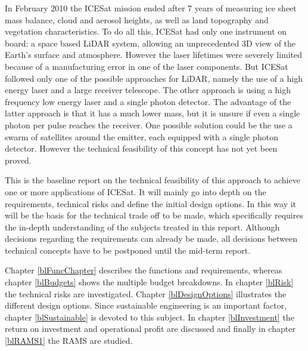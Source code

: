 In February 2010 the ICESat mission ended after 7 years of measuring ice sheet mass balance, cloud and aerosol heights, as well as land topography and vegetation characteristics.
To do all this, ICESat had only one instrument on board: a space based \ac{LiDAR} system, allowing an unprecedented 3D view of the Earth's surface and atmosphere.
However the laser lifetimes were severely limited because of a manufacturing error in one of the laser components.
But ICESat followed only one of the possible approaches for \ac{LiDAR}, namely the use of a high energy laser and a large receiver telescope. The other approach is using a high frequency low energy laser and a single photon detector. The advantage of the latter approach is that it has a much lower mass, but it is unsure if even a single photon per pulse reaches the receiver. One possible solution could be the use a swarm of satellites around the emitter, each equipped with a single photon detector. However the technical feasibility of this concept has not yet been proved.

This is the baseline report on the technical feasibility of this approach to achieve one or more applications of ICESat. It will mainly go into depth on the requirements, technical risks and define the initial design options. In this way it will be the basis for the technical trade off to be made, which specifically requires the in-depth understanding of the subjects treated in this report. Although decisions regarding the requirements can already be made, all decisions between technical concepts have to be postponed until the mid-term report.

Chapter \ref{blFuncChapter} describes the functions and requirements, whereas chapter \ref{blBudgets} shows the multiple budget breakdowns. In chapter \ref{blRisk} the technical risks are investigated. Chapter \ref{blDesignOptions} illustrates the different design options. Since sustainable engineering is an important factor, chapter \ref{blSustainable} is devoted to this subject. In chapter \ref{blInvestment} the return on investment and operational profit are discussed and finally in chapter \ref{blRAMS1} the \ac{RAMS} are studied.